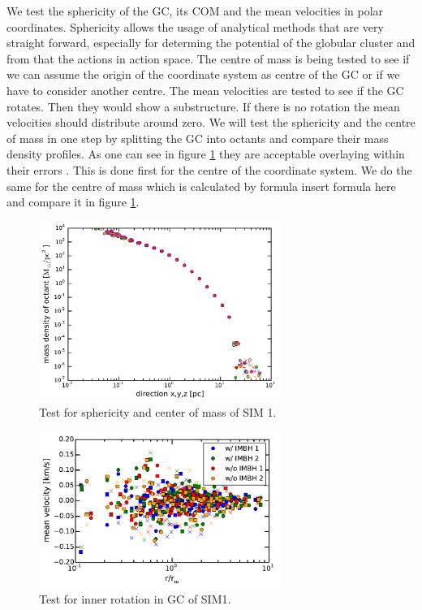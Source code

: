 \par We test the sphericity of the \ac{GC}, its \ac{COM} and the mean velocities in polar coordinates. Sphericity allows the usage of analytical methods that are very straight forward, especially for determing the potential of the globular cluster and from that the actions in action space. The centre of mass is being tested to see if we can assume the origin of the coordinate system as centre of the \ac{GC} or if we have to consider another centre. The mean velocities are tested to see if the \ac{GC} rotates. Then they would show a substructure. If there is no rotation the mean velocities should distribute around zero.
We will test the sphericity and the centre of mass in one step by splitting the \ac{GC} into octants and compare their mass density profiles. As one can see in figure \ref{fig:sphericity_com} they are acceptable overlaying \color{red} within their errors \color{black}. This is done first for the centre of the coordinate system. We do the same for the centre of mass which is calculated by formula \color{red} insert formula here \color{black} and compare it in figure \ref{fig:sphericity_com}.
\begin{figure}[htbp]
\centering
\includegraphics[width=0.7\textwidth]{Plots/sphericity_com.pdf}
\caption{Test for sphericity and center of mass of SIM 1.}
\label{fig:sphericity_com}
\end{figure}

\begin{figure}[htbp]
\centering
\includegraphics[width=0.7\textwidth]{Plots/mean_velocity.pdf}
\caption{Test for inner rotation in \ac{GC} of SIM1.}
\label{fig:mean_vel}
\end{figure}

